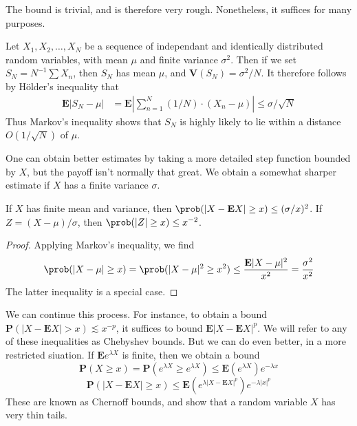 The bound is trivial, and is therefore very rough. Nonetheless, it suffices for many purposes.

\begin{example}
    Let $X_1, X_2, \dots, X_N$ be a sequence of independant and identically distributed random variables, with mean $\mu$ and finite variance $\sigma^2$. Then if we set $S_N = N^{-1} \sum X_n$, then $S_N$ has mean $\mu$, and $\mathbf{V}(S_N) = \sigma^2/N$. It therefore follows by H\"{o}lder's inequality that
    \begin{align*}
        \mathbf{E} \left| S_N - \mu \right| &= \mathbf{E} \left| \sum_{n = 1}^N (1/N) \cdot (X_n - \mu) \right| \leq \sigma / \sqrt{N}
    \end{align*}
    Thus Markov's inequality shows that $S_N$ is highly likely to lie within a distance $O(1/\sqrt{N})$ of $\mu$.
\end{example}

One can obtain better estimates by taking a more detailed step function bounded by $X$, but the payoff isn't normally that great. We obtain a somewhat sharper estimate if $X$ has a finite variance $\sigma$.

\begin{theorem}
    If $X$ has finite mean and variance, then $\prob(|X - \mathbf{E}X| \geq x) \leq (\sigma/x)^2$. If $Z = (X - \mu)/\sigma$, then $\prob(|Z| \geq x) \leq x^{-2}$.
\end{theorem}
\begin{proof}
    Applying Markov's inequality, we find
    \[ \prob(|X - \mu| \geq x) = \prob(|X - \mu|^2 \geq x^2) \leq \frac{\mathbf{E}|X - \mu|^2}{x^2} = \frac{\sigma^2}{x^2} \]
    The latter inequality is a special case.
\end{proof}

We can continue this process. For instance, to obtain a bound $\mathbf{P}(|X - \mathbf{E} X| > x) \lesssim x^{-p}$, it suffices to bound $\mathbf{E}|X - \mathbf{E}X|^p$. We will refer to any of these inequalities as Chebyshev bounds. But we can do even better, in a more restricted siuation. If $\mathbf{E} e^{\lambda X}$ is finite, then we obtain a bound
%
\[ \mathbf{P}(X \geq x) = \mathbf{P}(e^{\lambda X} \geq e^{\lambda X}) \leq \mathbf{E}(e^{\lambda X}) e^{-\lambda x} \]
\[ \mathbf{P}(|X - \mathbf{E} X| \geq x) \leq \mathbf{E}(e^{\lambda|X-\mathbf{E}X|^p}) e^{-\lambda |x|^p} \]
%
These are known as Chernoff bounds, and show that a random variable $X$ has very thin tails.

